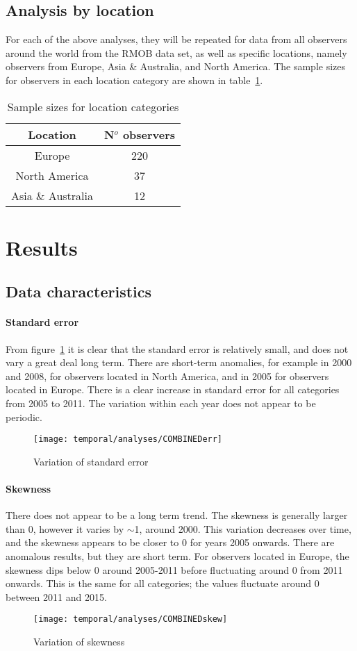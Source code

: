 \subsection{Analysis by location}
For each of the above analyses, they will be repeated for data from all observers around the world from the RMOB data set, as well as specific locations, namely observers from Europe, Asia \& Australia, and North America. The sample sizes for observers in each location category are shown in table~\ref{tab:temp:sizes}.
\begin{table}
	\centering
	\begin{tabular}{cc}
		\hline
		Location & N$^o$ observers \\
		\hline 
		Europe & 220 \\
		North America & 37 \\
		Asia \& Australia & 12 \\
		\hline
	\end{tabular}
	\caption{Sample sizes for location categories 
		\label{tab:temp:sizes}}
\end{table}
\section{Results}
\subsection{Data characteristics}
\paragraph{Standard error\\
	\label{par:err}}
From figure~\ref{fig:temp:err} it is clear that the standard error is relatively small, and does not vary a great deal long term. There are short-term anomalies, for example in 2000 and 2008, for observers located in North America, and in 2005 for observers located in Europe. There is a clear increase in standard error for all categories from 2005 to 2011. The variation within each year does not appear to be periodic.
\begin{figure}[h!]
	\centering
	\texttt{[image: temporal/analyses/COMBINEDerr]}
	\caption{Variation of standard error
		\label{fig:temp:err}}
\end{figure}
\paragraph{Skewness\\}
There does not appear to be a long term trend. The skewness is generally larger than 0, however it varies by $\sim$1, around 2000. This variation decreases over time, and the skewness appears to be closer to 0 for years 2005 onwards. There are anomalous results, but they are short term. For observers located in Europe, the skewness dips below 0 around 2005-2011 before fluctuating around 0 from 2011 onwards. This is the same for all categories; the values fluctuate around 0 between 2011 and 2015.
\begin{figure}[h!]
	\centering
	\texttt{[image: temporal/analyses/COMBINEDskew]}
	\caption{Variation of skewness
		\label{fig:temp:skew}}
\end{figure}
